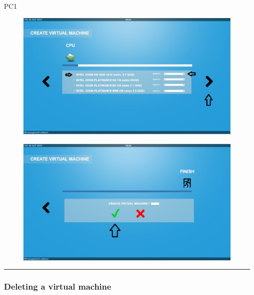 \begin{lyxlist}{PC1}
\begin{figure}[H]
\centering
\includegraphics[width=170mm]{images/createVMEx4.eps}
\caption{\label{overflow}}
\end{figure}


\begin{figure}[H]
\centering
\includegraphics[width=170mm]{images/createVMEx10.eps}
\caption{\label{overflow}}
\end{figure}

\end{lyxlist}
\hrule
\vspace{0.5cm}









\subsubsection{Deleting a virtual machine}

